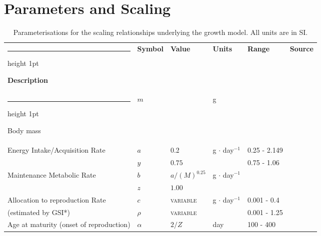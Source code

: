 \documentclass[a4paper]{article} %
\makeatletter
\newcommand{\thickhline}{%
    \noalign {\ifnum 0=`}\fi \hrule height 1pt
    \futurelet \reserved@a \@xhline
}
\makeatother
\begin{document}
\section{Parameters and Scaling}
\begin{table}[H]
    \caption{Parameterisations for the scaling relationships underlying the growth model. All units are in SI.}
    \begin{tabularx}{\linewidth}{Xlllll}
    \thickhline
    \textbf{Description}                        & \textbf{Symbol}       & \textbf{Value}            & \textbf{Units}        & \textbf{Range}                    & \textbf{Source}       \\ \thickhline
    Body mass                                   & $m$                   &                           & g                     &                                   &                       \\ \hline
    Energy Intake/Acquisition Rate              & $a$                   & 0.2                       & g $\cdot$ day$^{-1}$  & 0.25 - 2.149                      & \textcite{West2001}       \\ 
                                                & $y$                   & $0.75$                    & \textsc{}             & 0.75 - 1.06                       & \textcite{Pawar2012}      \\ \hline
    Maintenance Metabolic Rate                  & $b$                   & $a/(M)^{0.25}$            & g $\cdot$ day$^{-1}$  &                                   & \textcite{West2001}       \\ 
                                                & $z$                   & $1.00$                    & \textsc{}             &                                   &                       \\ \hline
    Allocation to reproduction Rate             & $c$                   & \textsc{variable}         & g $\cdot$ day$^{-1}$  & 0.001 - 0.4                       & \textcite{Charnov2001}    \\  %
    (estimated by GSI*)                         & $\rho$                & \textsc{variable}         & \textsc{}             & 0.001 - 1.25                      & \textcite{Barneche2018-reproductive_output}                      \\ \hline %
    Age at maturity (onset of reproduction)     & $\alpha$              & $2/Z$                     & day                   & 100 - 400                         &                       \\ \hline

\end{tabularx}
\end{table}
\end{document}
